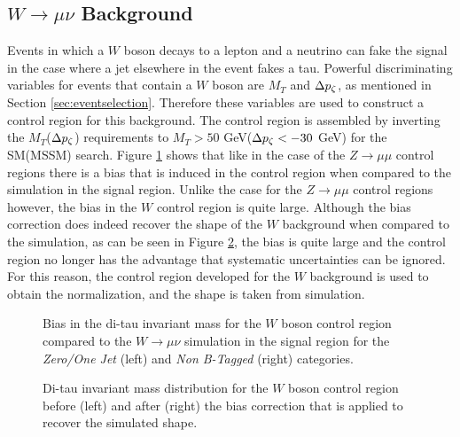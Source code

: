 \subsection{\texorpdfstring{$W\rightarrow\mu\nu$}{W To Muon Plus Neutrino} Background}
Events in which a $W$ boson decays to a lepton and a neutrino can fake the signal in the case where a jet elsewhere in the event fakes a tau.
Powerful discriminating variables for events that contain a $W$ boson are $M_{T}$ and $\Delta p_{\zeta}$, as mentioned in Section \ref{sec:eventselection}. 
Therefore these variables are used to construct a control region for this background.
The control region is assembled by inverting the $M_{T}$($\Delta p_{\zeta}$) requirements to $M_{T} > 50$ GeV($\Delta p_{\zeta} < -30$ GeV) for the SM(MSSM) search.
Figure \ref{fig:wjetsbias} shows that like in the case of the $Z\rightarrow\mu\mu$ control regions there is a bias that is induced in the control region when compared to the simulation in the signal region.
Unlike the case for the $Z\rightarrow\mu\mu$ control regions however, the bias in the $W$ control region is quite large.
Although the bias correction does indeed recover the shape of the $W$ background when compared to the simulation, as can be seen in Figure \ref{fig:wjetscorrection}, the bias is quite large and the control region no longer has the advantage that systematic uncertainties can be ignored.
For this reason, the control region developed for the $W$ background is used to obtain the normalization, and the shape is taken from simulation.

\begin{figure}[ht]
\centering
{}
\caption{Bias in the di-tau invariant mass for the $W$ boson control region compared to the $W\rightarrow\mu\nu$ simulation in the signal region for the \emph{Zero/One Jet} (left) and \emph{Non B-Tagged} (right) categories.} 
\label{fig:wjetsbias}
\end{figure}

\begin{figure}[tpb]
\centering
{}

\caption{Di-tau invariant mass distribution for the $W$ boson control region before (left) and after (right) the bias correction that is applied to recover the simulated shape.}
\label{fig:wjetscorrection}
\end{figure}

